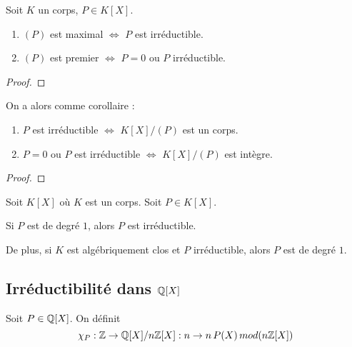 \begin{proposition}
	Soit $K$ un corps, $P \in K[X]$.
	\begin{enumerate}
		\item $(P)$ est maximal $\Leftrightarrow$ $P$ est irréductible.
		\item $(P)$ est premier $\Leftrightarrow$ $P = 0$ ou $P$
			irréductible.
	\end{enumerate}
\end{proposition}

\ifdefined\outputproof
\begin{proof}

\end{proof}
\fi

On a alors comme corollaire :

\begin{corollary}
	\begin{enumerate}
		\item $P$ est irréductible $\Leftrightarrow$ $K[X]/(P)$ est un corps.
		\item $P = 0$ ou $P$ est irréductible $\Leftrightarrow$ $K[X]/(P)$ est
			intègre.
	\end{enumerate}
\end{corollary}

\ifdefined\outputproof
\begin{proof}

\end{proof}
\fi

\begin{proposition}
	Soit $K[X]$ où $K$ est un corps. Soit $P \in K[X]$.

	Si $P$ est de degré $1$, alors $P$ est irréductible.

	De plus, si $K$ est algébriquement clos et $P$ irréductible, alors $P$ est
	de degré $1$.
\end{proposition}

\subsection{Irréductibilité dans $\mathbb{Q}[X]$}

\begin{definition}
	Soit $P \in \mathbb{Q}[X]$. On définit
	\begin{equation}
		\chi_{P} : \mathbb{Z} \rightarrow \mathbb{Q}[X] / n \mathbb{Z}[X] : n
		\rightarrow n \, P(X) \, mod(n \mathbb{Z}[X])
	\end{equation}
\end{definition}

